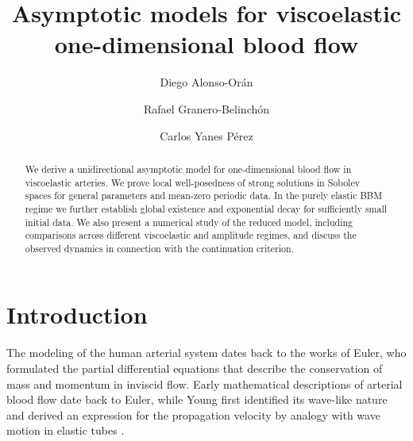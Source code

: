 \documentclass[reqno]{amsart}
\theoremstyle{definition}
\numberwithin{equation}{section}
\numberwithin{theorem}{section}
\numberwithin{definition}{section}
\begin{document}
\subjclass[2010]{}

\title[Asymptotic models for viscoelastic one-dimensional blood flow]{Asymptotic models for viscoelastic one-dimensional blood flow}

\author[D. Alonso-Or\'an]{Diego Alonso-Or\'an}
\address{Departamento de An\'{a}lisis Matem\'{a}tico and Instituto de Matem\'aticas y Aplicaciones (IMAULL), Universidad de La Laguna, C/Astrof\'{i}sico Francisco S\'{a}nchez s/n, 38271, La Laguna, Spain. \href{mailto:dalonsoo@ull.edu.es}dalonsoo@ull.edu.es}

\author[R. Granero-Belinch\'on]{Rafael Granero-Belinch\'on}
\address{Departamento  de  Matem\'aticas,  Estad\'istica  y  Computaci\'on,  Universidad  de Cantabria.  Avda.  Los  Castros  s/n,  Santander,  Spain. \href{mailto:rafael.granero@unican.es}rafael.granero@unican.es}


\author[Carlos Yanes P\'erez]{Carlos Yanes P\'erez}
\address{Universidad de La Laguna, C/Astrof\'{i}sico Francisco S\'{a}nchez s/n, 38271, La Laguna, Spain. \href{mailto:alu0101430720@ull.edu.es}alu0101430720@ull.edu.es}



\begin{abstract}
We derive a unidirectional asymptotic model for one-dimensional blood flow in viscoelastic arteries. We prove local well-posedness of strong solutions in Sobolev spaces for general parameters and mean-zero periodic data. In the purely elastic BBM regime we further establish global existence and exponential decay for sufficiently small initial data. We also present a numerical study of the reduced model, including comparisons across different viscoelastic and amplitude regimes, and discuss the observed dynamics in connection with the continuation criterion.
\end{abstract}




\maketitle
\tableofcontents


\section{Introduction}
The modeling of the human arterial system dates back to the works of Euler, who formulated the partial differential equations that describe the conservation of mass and momentum in inviscid flow. Early mathematical descriptions of arterial blood flow date back to Euler, while Young first identified its wave-like nature and derived an expression for the propagation velocity by analogy with wave motion in elastic tubes \cite{father_hemo, hemomath}. \medskip
\end{document}
